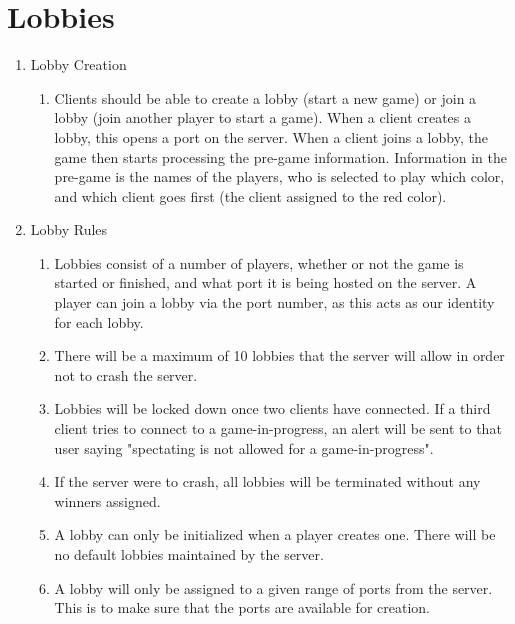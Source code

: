 \documentclass{scrreprt}
\begin{document}
\section{Lobbies}
\begin{enumerate}[label*=L\arabic*.]
    \item Lobby Creation    
        \begin{enumerate}[label*=\arabic*.]
            \item Clients should be able to create a lobby (start a new game) or join a lobby (join another player to start a game).
                \subitem When a client creates a lobby, this opens a port on the server.
                \subitem When a client joins a lobby, the game then starts processing the pre-game information.
                \subitem Information in the pre-game is the names of the players, who is selected to play which color, and which client goes first (the client assigned to the red color).
        \end{enumerate}
    \item Lobby Rules
        \begin{enumerate}[label*=\arabic*.]
            \item Lobbies consist of a number of players, whether or not the game is started or finished, and what port it is being hosted on the server.
                \subitem A player can join a lobby via the port number, as this acts as our identity for each lobby.
            \item There will be a maximum of 10 lobbies that the server will allow in order not to crash the server.
            \item Lobbies will be locked down once two clients have connected.
                \subitem If a third client tries to connect to a game-in-progress, an alert will be sent to that user saying "spectating is not allowed for a game-in-progress".
            \item If the server were to crash, all lobbies will be terminated without any winners assigned.
            \item A lobby can only be initialized when a player creates one. There will be no default lobbies maintained by the server.
            \item A lobby will only be assigned to a given range of ports from the server. This is to make sure that the ports are available for creation.                         
        \end{enumerate}
\end{enumerate}
\end{document}
